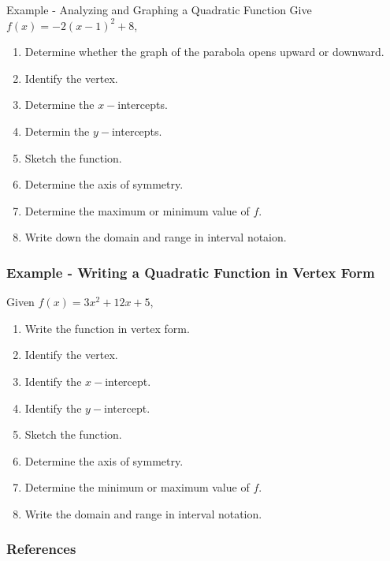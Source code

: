\documentclass{beamer}
\begin{document}
\begin{frame}{Example - Analyzing and Graphing a Quadratic Function}
Give \(f(x)=-2(x-1)^2+8\),
\begin{enumerate}
    \item Determine whether the graph of the parabola opens upward or downward. \pause
    \item Identify the vertex. \pause 
    \item Determine the \(x-\)intercepts. \pause 
    \item Determin the \(y-\)intercepts. \pause
    \item Sketch the function. \pause
    \item Determine the axis of symmetry. \pause  
    \item Determine the maximum or minimum value of \(f\).\pause
    \item Write down the domain and range in interval notaion. 
\end{enumerate} 

    
\end{frame}

\begin{frame}
    \frametitle{Example - Writing a Quadratic Function in Vertex Form}

    Given \(f(x)=3x^2 +12x+5\),

    \begin{enumerate}
        \item Write the function in vertex form. \pause
        \item Identify the vertex. \pause
        \item Identify the \(x-\)intercept.\pause
        \item Identify the \(y-\)intercept. \pause
        \item Sketch the function.\pause
        \item Determine the axis of symmetry. \pause
        \item Determine the minimum or maximum value of \(f\). \pause
        \item Write the domain and range in interval notation. 
    \end{enumerate}

\end{frame}



\begin{frame}
    \frametitle{References}
\end{frame}
\end{document}
